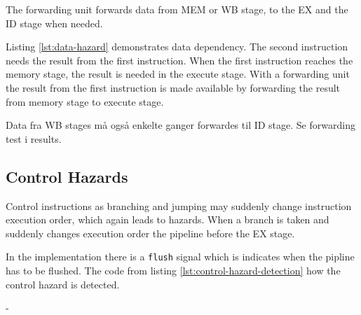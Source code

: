 The forwarding unit forwards data from MEM or WB stage, to the EX and the ID stage when needed.

Listing \ref{lst:data-hazard} demonstrates data dependency.
The second instruction needs the result from the first instruction.
When the first instruction reaches the memory stage, the result is needed in the execute stage.
With a forwarding unit the result from the first instruction is made available by forwarding the result from memory stage to execute stage.

Data fra WB stages må også enkelte ganger forwardes til ID stage. Se forwarding test i results.


\subsection{Control Hazards}
Control instructions as branching and jumping may suddenly change instruction execution order,
which again leads to hazards.
When a branch is taken and suddenly changes execution order the pipeline before the EX stage.

In the implementation there is a \texttt{flush} signal which is indicates when the pipline has to be flushed.
The code from listing \ref{lst:control-hazard-detection} how the control hazard is detected.





-
